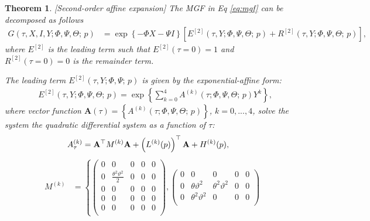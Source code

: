 \documentclass[pdftex,11pt,a4paper] {article}
\newtheorem{theorem}{Theorem}[section]
\begin{document}
\begin{theorem}\label{pr:b2} [Second-order affine expansion] The MGF in Eq \eqref{eq:mgf} can be decomposed as follows
\begin{equation}\label{eq:b21}
\begin{split}
G(\tau,X,I,Y; \Phi,\Psi,\Theta;\,p)& = \exp \left\{-\Phi X-\Psi I \right\}\left[ E^{[2]}(\tau,Y; \Phi,\Psi,\Theta;\,p)+ R^{[2]}(\tau,Y; \Phi,\Psi,\Theta;\,p)  \right],
\end{split}
\end{equation}
where $E^{[2]}$ is the leading term such that $E^{[2]}(\tau=0)=1$  and $R^{[2]}(\tau=0)=0$ is the remainder term.


The leading term $E^{[2]}(\tau,Y; \Phi,\Psi;\,p)$ is given by the exponential-affine form:
\begin{equation}\label{eq:b22}
\begin{split}
& E^{[2]}(\tau,Y; \Phi,\Psi,\Theta;\,p)= \exp \left\{\sum^{4}_{k=0}A^{(k)}(\tau;\Phi,\Psi,\Theta;\,p)Y^{k}  \right\},
\end{split}
\end{equation}
where vector function $\mathbf{A}(\tau)=\left\{A^{(k)}(\tau;\Phi,\Psi,\Theta;\,p)\right\}$,  $k=0,...,4$, solve the system the quadratic differential system as a function of $\tau$: 
\begin{equation}\label{eq:OrigMGFLogAndQVOrd2}
\begin{split}
A^{(k)}_\tau&=\mathbf{A}^\top M^{(k)}\mathbf{A} + \left(L^{(k)}(p)\right)^\top\mathbf{A} + H^{(k)}(p),\vspace*{-1.0\baselineskip}
\end{split}
\end{equation}
\begin{equation*}
\begin{split}
M^{(k)}&=\left\{
\begin{pmatrix} %
0 & 0 & 0 & 0 & 0 \\
0 & \frac{\theta^2\vartheta^2}{2} & 0 & 0 & 0 \\
0 & 0 & 0 & 0 & 0 \\
0 & 0 & 0 & 0 & 0 \\
0 & 0 & 0 & 0 & 0 \\
\end{pmatrix}, 
\begin{pmatrix} %
0 & 0 & 0 & 0 & 0 \\
0 & \theta\vartheta^2 & \theta^2\vartheta^2 & 0 & 0 \\
0 & \theta^2\vartheta^2 & 0 & 0 & 0 \\

\end{pmatrix}
\end{split}
\end{equation*}
\end{theorem}
\end{document}
